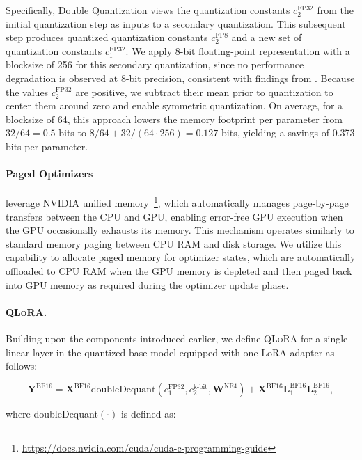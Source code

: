 Specifically, Double Quantization views the quantization constants $c_2^{\text{FP32}}$ from the initial quantization step as inputs to a secondary quantization. This subsequent step produces quantized quantization constants $c_2^{\text{FP8}}$ and a new set of quantization constants $c_1^{\text{FP32}}$. We apply 8-bit floating-point representation with a blocksize of 256 for this secondary quantization, since no performance degradation is observed at 8-bit precision, consistent with findings from \citet{dettmers2022case}. Because the values $c_2^{\text{FP32}}$ are positive, we subtract their mean prior to quantization to center them around zero and enable symmetric quantization. On average, for a blocksize of 64, this approach lowers the memory footprint per parameter from $32/64=0.5$ bits to $8/64 + 32/(64 \cdot 256) = 0.127$ bits, yielding a savings of 0.373 bits per parameter.

\paragraph{Paged Optimizers} leverage NVIDIA unified memory~\footnote{\tiny \url{https://docs.nvidia.com/cuda/cuda-c-programming-guide}}, which automatically manages page-by-page transfers between the CPU and GPU, enabling error-free GPU execution when the GPU occasionally exhausts its memory. This mechanism operates similarly to standard memory paging between CPU RAM and disk storage. We utilize this capability to allocate paged memory for optimizer states, which are automatically offloaded to CPU RAM when the GPU memory is depleted and then paged back into GPU memory as required during the optimizer update phase.

\paragraph{\textsc{QLoRA}.} Building upon the components introduced earlier, we define \textsc{QLoRA} for a single linear layer in the quantized base model equipped with one LoRA adapter as follows:

\begin{equation}
    \mathbf{Y}^{\text{BF16}} =  \mathbf{X}^{\text{BF16}} \text{doubleDequant}(c_1^{\text{FP32}}, c_2^{\text{k-bit}}, \mathbf{W}^{\text{NF4}}) + \mathbf{X}^{\text{BF16}}\mathbf{L}^{\text{BF16}}_1\mathbf{L}^{\text{BF16}}_2,
\end{equation}

where doubleDequant$(\cdot)$ is defined as:

